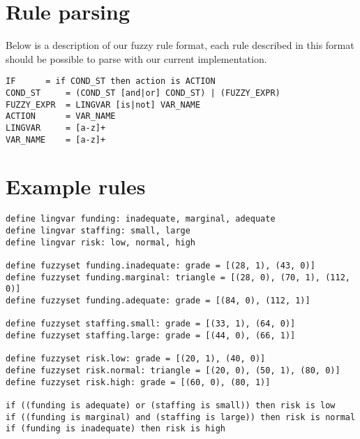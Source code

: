 \appendix

\section{Rule parsing}\label{rule parsing}
Below is a description of our fuzzy rule format, each rule described in this
format should be possible to parse with our current implementation.

\lstset{frame=single, breaklines=true}
\begin{lstlisting}[label=lst: bnf, caption=BNF of our rules]
IF		= if COND_ST then action is ACTION
COND_ST		= (COND_ST [and|or] COND_ST) | (FUZZY_EXPR)
FUZZY_EXPR	= LINGVAR [is|not] VAR_NAME
ACTION		= VAR_NAME
LINGVAR		= [a-z]+
VAR_NAME	= [a-z]+
\end{lstlisting}

\section{Example rules}\label{example rules}

\begin{lstlisting}[label=lst:example rules, caption=Example rules representing
project risks]
define lingvar funding: inadequate, marginal, adequate
define lingvar staffing: small, large
define lingvar risk: low, normal, high

define fuzzyset funding.inadequate: grade = [(28, 1), (43, 0)]
define fuzzyset funding.marginal: triangle = [(28, 0), (70, 1), (112, 0)]
define fuzzyset funding.adequate: grade = [(84, 0), (112, 1)]

define fuzzyset staffing.small: grade = [(33, 1), (64, 0)]
define fuzzyset staffing.large: grade = [(44, 0), (66, 1)]

define fuzzyset risk.low: grade = [(20, 1), (40, 0)]
define fuzzyset risk.normal: triangle = [(20, 0), (50, 1), (80, 0)]
define fuzzyset risk.high: grade = [(60, 0), (80, 1)]

if ((funding is adequate) or (staffing is small)) then risk is low
if ((funding is marginal) and (staffing is large)) then risk is normal
if (funding is inadequate) then risk is high
\end{lstlisting}
